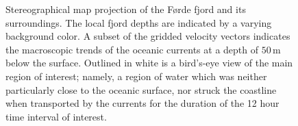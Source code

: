 \begin{figure}[htpb]
    \centering
    \caption[Stereographical map projection of the Førde fjord and its
    surroundings]
    {Stereographical map projection of the Førde fjord and its surroundings.
        The local fjord depths are indicated by a varying background color. A
        subset of the gridded velocity vectors indicates the macroscopic trends
        of the oceanic currents at a depth of $50\,\si{\meter}$ below the
        surface. Outlined in white is a bird's-eye view of the main region of
        interest; namely, a region of water which was neither particularly
        close to the oceanic surface, nor struck the coastline when transported
        by the currents for the duration of the 12 hour time interval of
    interest.}
    \label{fig:currentmap}
\end{figure}

